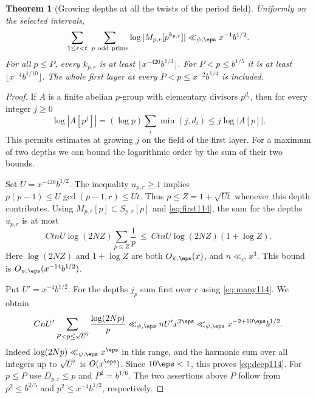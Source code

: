 \documentclass[a4paper,11pt]{article}
\newtheorem{theorem}[proposition]{Theorem}
\theoremstyle{definition}
\theoremstyle{remark}
\numberwithin{equation}{section}
\begin{document}
\begin{theorem}[Growing depths at all the twists of the period field]
\label{thm:deep114}
Uniformly on the selected intervals,
\begin{equation}
 \sum_{1\le r<t}\ \sum_{p\ {\rm odd\ prime}}
       \log|M_{p,r}[p^{k_{p,r}}]|
      \ll_{\psi,\eps} x^{-1}b^{1/2}.                    \label{eq:deep114}
\end{equation}
For all \(p\le P\), every \(k_{p,r}\) is at least
\(\lfloor x^{-420}b^{1/3}\rfloor\). For
\(P<p\le b^{1/5}\) it is at least
\(\lfloor x^{-4}b^{1/10}\rfloor\). The whole first layer at
every \(P<p\le x^{-2}b^{1/4}\) is included.
\end{theorem}
\begin{proof}
If \(A\) is a finite abelian \(p\)-group with elementary
divisors \(p^{d_i}\), then for every integer \(j\ge0\)
\[
     \log|A[p^j]|=(\log p)\sum_i\min(j,d_i)
                        \le j\log|A[p]|.
\]
This permits estimates at growing \(j\) on the field of the
first layer. For a maximum of two depths we can bound the
logarithmic order by the sum of their two bounds.

Set \(U=x^{-420}b^{1/2}\). The inequality \(u_{p,r}\ge1\)
implies \(p(p-1)\le U\gcd(p-1,r)\le Ut\). Thus
\(p\le Z=1+\sqrt{Ut}\) whenever this depth contributes.
Using \(M_{p,r}[p]\subset S_{p,r}[p]\) and
\eqref{eq:first114}, the sum for the depths \(u_{p,r}\) is
at most
\[
 C t n U\log(2NZ)\sum_{p\le Z}\frac1p
       \ \le\ C t n U\log(2NZ)(1+\log Z).
\]
Here \(\log(2NZ)\) and \(1+\log Z\) are both \(O_{\psi,\eps}(x)\),
and \(n\ll_\psi x^3\). This bound is
\(O_{\psi,\eps}(x^{-14}b^{1/2})\).

Put \(U'=x^{-4}b^{1/2}\). For the depths \(j_p\) sum first
over \(r\) using \eqref{eq:many114}. We obtain
\[
 C nU'\sum_{P<p\le\sqrt{U'}}\frac{\log(2Np)}p
 \ll_{\psi,\eps} nU' x^{2\eps}
 \ll_{\psi,\eps} x^{-2+10\eps}b^{1/2}.
\]
Indeed \(\log(2Np)\ll_{\psi,\eps} x^\eps\) in this range,
and the harmonic sum over all integers up to \(\sqrt{U'}\)
is \(O(x^\eps)\). Since \(10\eps<1\), this proves
\eqref{eq:deep114}. For \(p\le P\) use \(D_{p,r}\le p\)
and \(P^2=b^{1/6}\). The two assertions above \(P\) follow
from \(p^2\le b^{2/5}\) and \(p^2\le x^{-4}b^{1/2}\),
respectively.
\end{proof}
\end{document}
